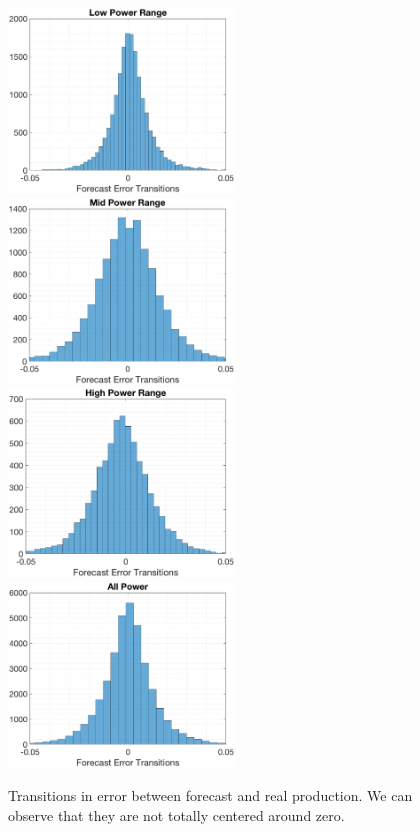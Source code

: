 \documentclass[11pt]{article}
\begin{document}
\begin{figure}
  \includegraphics[width=60mm,scale=1]{plots/LP_t.eps}
  \includegraphics[width=60mm,scale=1]{plots/MP_t.eps}\\
   \includegraphics[width=60mm,scale=1]{plots/HP_t.eps}
  \includegraphics[width=60mm,scale=1]{plots/AP_t.eps}
  \caption{Transitions in error between forecast and real production. We can observe that they are not totally centered around zero.}
  \label{fig:error_transitions}
\end{figure}
\end{document}
